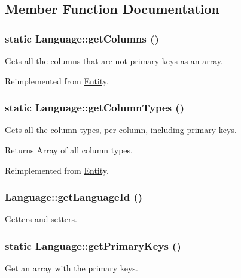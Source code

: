 \subsection{Member Function Documentation}
\hypertarget{classLanguage_aca9b17402d92635b3092d255ca90e551}{
\subsubsection[{getColumns}]{\setlength{\rightskip}{0pt plus 5cm}static Language::getColumns ()}}
\label{classLanguage_aca9b17402d92635b3092d255ca90e551}
Gets all the columns that are not primary keys as an array. 

Reimplemented from \hyperlink{classEntity_a394717a08ffd54ec9a14d06727c86719}{Entity}.

\hypertarget{classLanguage_a6e5cf86376e603ee4945b514fb6de7bd}{
\subsubsection[{getColumnTypes}]{\setlength{\rightskip}{0pt plus 5cm}static Language::getColumnTypes ()}}
\label{classLanguage_a6e5cf86376e603ee4945b514fb6de7bd}
Gets all the column types, per column, including primary keys.

\begin{DoxyReturn}{Returns}
Array of all column types. 
\end{DoxyReturn}


Reimplemented from \hyperlink{classEntity_ad69437219c10955803707fbf6ac458e7}{Entity}.

\hypertarget{classLanguage_ae8b3c5092853212ca93c29c3af395326}{
\subsubsection[{getLanguageId}]{\setlength{\rightskip}{0pt plus 5cm}Language::getLanguageId ()}}
\label{classLanguage_ae8b3c5092853212ca93c29c3af395326}
Getters and setters. \hypertarget{classLanguage_ad85ca28f29f19ec96d0151d21a2485a6}{
\subsubsection[{getPrimaryKeys}]{\setlength{\rightskip}{0pt plus 5cm}static Language::getPrimaryKeys ()}}
\label{classLanguage_ad85ca28f29f19ec96d0151d21a2485a6}
Get an array with the primary keys. 

